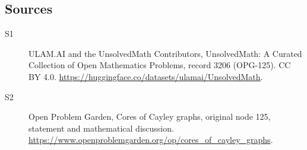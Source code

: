 \documentclass[11pt]{article}
\begin{document}
\subsection{Sources}
\begin{description}
\item[\hypertarget{source:3206:1}{S1}] ULAM.AI and the UnsolvedMath Contributors, UnsolvedMath: A Curated Collection of Open Mathematics Problems, record 3206 (OPG-125). CC BY 4.0. \url{https://huggingface.co/datasets/ulamai/UnsolvedMath}.
\item[\hypertarget{source:3206:2}{S2}] Open Problem Garden, Cores of Cayley graphs, original node 125, statement and mathematical discussion. \url{https://www.openproblemgarden.org/op/cores_of_cayley_graphs}.
\end{description}
\label{end:3206}
\end{document}
